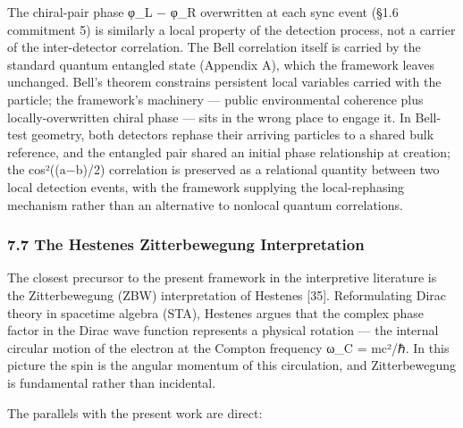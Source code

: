 \documentclass[
]{article}
\begin{document}
The chiral-pair phase φ\_L − φ\_R overwritten at each sync event (§1.6
commitment 5) is similarly a local property of the detection process,
not a carrier of the inter-detector correlation. The Bell correlation
itself is carried by the standard quantum entangled state (Appendix A),
which the framework leaves unchanged. Bell's theorem constrains
persistent local variables carried with the particle; the framework's
machinery --- public environmental coherence plus locally-overwritten
chiral phase --- sits in the wrong place to engage it. In Bell-test
geometry, both detectors rephase their arriving particles to a shared
bulk reference, and the entangled pair shared an initial phase
relationship at creation; the cos²((a−b)/2) correlation is preserved as
a relational quantity between two local detection events, with the
framework supplying the local-rephasing mechanism rather than an
alternative to nonlocal quantum correlations.

\subsubsection{7.7 The Hestenes Zitterbewegung
Interpretation}\label{the-hestenes-zitterbewegung-interpretation}

The closest precursor to the present framework in the interpretive
literature is the Zitterbewegung (ZBW) interpretation of Hestenes
{[}35{]}. Reformulating Dirac theory in spacetime algebra (STA),
Hestenes argues that the complex phase factor in the Dirac wave function
represents a physical rotation --- the internal circular motion of the
electron at the Compton frequency ω\_C = mc²/ℏ. In this picture the spin
is the angular momentum of this circulation, and Zitterbewegung is
fundamental rather than incidental.

The parallels with the present work are direct:
\end{document}

